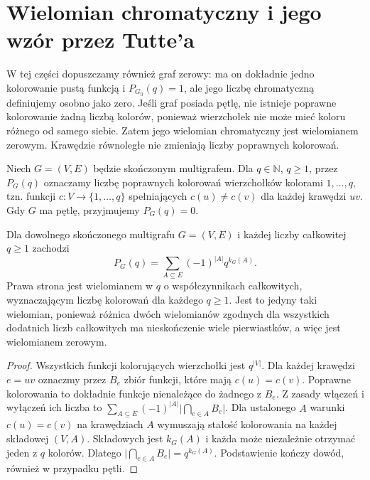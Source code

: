 \section{Wielomian chromatyczny i jego wzór przez Tutte'a}
\label{sec:tg-chromatic}

\begin{uwaga}
W tej części dopuszczamy również graf zerowy: ma on dokładnie
jedno kolorowanie pustą funkcją i $P_{G_0}(q)=1$, ale jego
liczbę chromatyczną definiujemy osobno jako zero. Jeśli graf
posiada pętlę, nie istnieje poprawne kolorowanie żadną liczbą
kolorów, ponieważ wierzchołek nie może mieć koloru różnego
od samego siebie. Zatem jego wielomian chromatyczny jest
wielomianem zerowym. Krawędzie równoległe nie zmieniają
liczby poprawnych kolorowań.
\end{uwaga}

\begin{definicja}
Niech $G=(V,E)$ będzie skończonym multigrafem.
Dla $q\in\mathbb N$, $q\ge1$, przez $P_G(q)$ oznaczamy
liczbę poprawnych kolorowań wierzchołków kolorami
$1,\ldots,q$, tzn. funkcji $c:V\to\{1,\ldots,q\}$
spełniających $c(u)\ne c(v)$ dla każdej krawędzi $uv$.
Gdy $G$ ma pętlę, przyjmujemy $P_G(q)=0$.
\end{definicja}

\begin{twierdzenie}
\label{thm:tg-chromatic-inclusion}
Dla dowolnego skończonego multigrafu $G=(V,E)$ i każdej
liczby całkowitej $q\ge1$ zachodzi
\[
 P_G(q)=\sum_{A\subseteq E}(-1)^{|A|}q^{k_G(A)}.
\]
Prawa strona jest wielomianem w $q$ o współczynnikach
całkowitych, wyznaczającym liczbę kolorowań dla każdego $q\ge1$.
Jest to jedyny taki wielomian, ponieważ różnica dwóch
wielomianów zgodnych dla wszystkich dodatnich liczb
całkowitych ma nieskończenie wiele pierwiastków,
a więc jest wielomianem zerowym.
\end{twierdzenie}

\begin{proof}
Wszystkich funkcji kolorujących wierzchołki jest $q^{|V|}$.
Dla każdej krawędzi $e=uv$ oznaczmy przez $B_e$
zbiór funkcji, które mają $c(u)=c(v)$.
Poprawne kolorowania to dokładnie funkcje nienależące
do żadnego z $B_e$. Z zasady włączeń i wyłączeń ich liczba
to $\sum_{A\subseteq E}(-1)^{|A|}\bigl|\bigcap_{e\in A}B_e\bigr|$.
Dla ustalonego $A$ warunki $c(u)=c(v)$ na krawędziach $A$
wymuszają stałość kolorowania na każdej składowej $(V,A)$.
Składowych jest $k_G(A)$ i każda może niezależnie otrzymać
jeden z $q$ kolorów. Dlatego
$\bigl|\bigcap_{e\in A}B_e\bigr|=q^{k_G(A)}$.
Podstawienie kończy dowód, również w przypadku pętli.
\end{proof}

